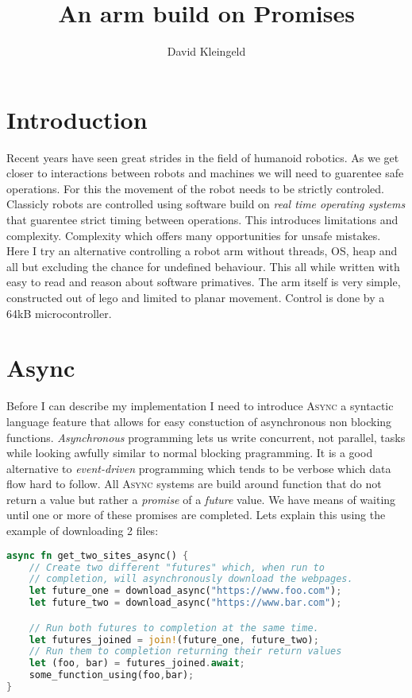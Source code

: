 \documentclass[lang=en, hanging-titles=true]{skrapport}
\title{An arm build on Promises}
\author[dskleingeld@gmail.com]{David Kleingeld}
\begin{document}
\maketitle
\tableofcontents

\section{Introduction}
Recent years have seen great strides in the field of humanoid robotics. As we get closer to interactions between robots and machines we will need to guarentee safe operations. For this the movement of the robot needs to be strictly controled. Classicly robots are controlled using software build on \textit{real time operating systems} that guarentee strict timing between operations. This introduces limitations and complexity. Complexity which offers many opportunities for unsafe mistakes. Here I try an alternative controlling a robot arm without threads, OS, heap and all but excluding the chance for undefined behaviour. This all while written with easy to read and reason about software primatives. The arm itself is very simple, constructed out of lego and limited to planar movement. Control is done by a 64kB microcontroller.

\section{Async}
Before I can describe my implementation I need to introduce \textsc{Async} a syntactic language feature that allows for easy constuction of asynchronous non blocking functions. \textit{Asynchronous} programming lets us write concurrent, not parallel, tasks while looking awfully similar to normal blocking pragramming. It is a good alternative to \textit{event-driven} programming which tends to be verbose which data flow hard to follow. All \textsc{Async} systems are build around function that do not return a value but rather a \textit{promise} of a \textit{future} value. We have means of waiting until one or more of these promises are completed. Lets explain this using the example of downloading 2 files:

\begin{lstlisting}[language=rust, style=boxed, tabsize=2]
async fn get_two_sites_async() {
	// Create two different "futures" which, when run to 
	// completion, will asynchronously download the webpages.
	let future_one = download_async("https://www.foo.com");
	let future_two = download_async("https://www.bar.com");

	// Run both futures to completion at the same time.
	let futures_joined = join!(future_one, future_two);
	// Run them to completion returning their return values
	let (foo, bar) = futures_joined.await;
	some_function_using(foo,bar);
}
\end{lstlisting}
\end{document}
